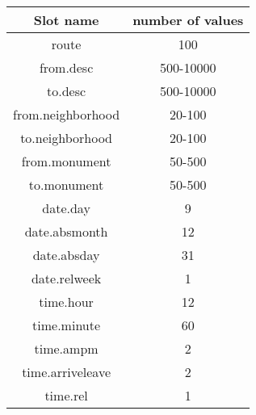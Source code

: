 \begin{tabular}{c|c}
Slot name& number of values\\\hline
route&100\\
from.desc&500-10000\\
to.desc&500-10000\\
from.neighborhood&20-100\\
to.neighborhood&20-100\\
from.monument&50-500\\
to.monument&50-500\\
date.day&9\\
date.absmonth&12\\
date.absday&31\\
date.relweek&1\\
time.hour&12\\
time.minute&60\\
time.ampm&2\\
time.arriveleave&2\\
time.rel&1\\
\end{tabular}